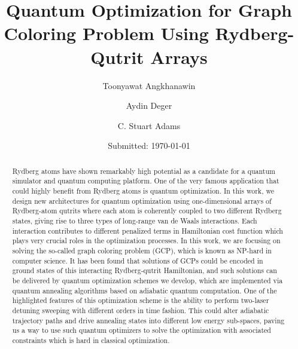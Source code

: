 \documentclass[%
 reprint,
nofootinbib,
 amsmath,amssymb,
 aps,
floatfix,
]{revtex4-2}
\begin{document}
\title{Quantum Optimization for Graph Coloring Problem Using Rydberg-Qutrit Arrays} 
\date{Submitted: \today{}}
\author{Toonyawat Angkhanawin}
\author{Aydin Deger}
\author{C. Stuart Adams}


\begin{abstract}
Rydberg atoms have shown remarkably high potential as a candidate for a quantum simulator and quantum computing platform. One of the very famous application that could highly benefit from Rydberg atoms is quantum optimization. In this work, we design new architectures for quantum optimization using one-dimensional arrays of Rydberg-atom qutrits where each atom is coherently coupled to two different Rydberg states, giving rise to three types of long-range van de Waals interactions. Each interaction contributes to different penalized terms in Hamiltonian cost function which plays very crucial roles in the optimization processes. In this work, we are focusing on solving the so-called graph coloring problem (GCP), which is known as NP-hard in computer science. It has been found that solutions of GCPs could be encoded in ground states of this interacting Rydberg-qutrit Hamiltonian, and such solutions can be delivered by quantum optimization schemes we develop, which are implemented via quantum annealing algorithms based on adiabatic quantum computation. One of the highlighted features of this optimization scheme is the ability to perform two-laser detuning sweeping with different orders in time fashion. This could alter adiabatic trajectory paths and drive annealing states into different low energy sub-spaces, paving us a way to use such quantum optimizers to solve the optimization with associated constraints which is hard in classical optimization.
\end{abstract}

\maketitle
\end{document}
